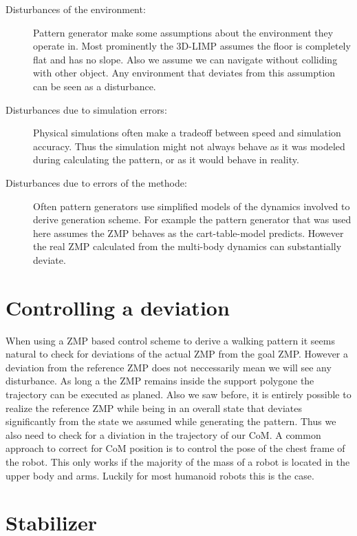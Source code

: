 \documentclass[english,ngerman]{KITreprt}
\begin{document}
\begin{description}
\item[Disturbances of the environment:]
Pattern generator make some assumptions about the environment they
operate in. Most prominently the 3D-LIMP assumes the floor is completely
flat and has no slope. Also we assume we can navigate without colliding
with other object. Any environment that deviates from this assumption
can be seen as a disturbance.
\item[Disturbances due to simulation errors:]
Physical simulations often make a tradeoff between speed and simulation
accuracy. Thus the simulation might not always behave as it was modeled
during calculating the pattern, or as it would behave in reality.
\item[Disturbances due to errors of the methode:]
Often pattern generators use simplified models of the dynamics involved
to derive generation scheme. For example the pattern generator that was
used here assumes the ZMP behaves as the cart-table-model predicts.
However the real ZMP calculated from the multi-body dynamics can
substantially deviate.
\end{description}

\section{Controlling a deviation}\label{controlling-a-deviation}

When using a ZMP based control scheme to derive a walking pattern it
seems natural to check for deviations of the actual ZMP from the goal
ZMP. However a deviation from the reference ZMP does not neccessarily
mean we will see any disturbance. As long a the ZMP remains inside the
support polygone the trajectory can be executed as planed. Also we saw
before, it is entirely possible to realize the reference ZMP while being
in an overall state that deviates significantly from the state we
assumed while generating the pattern. Thus we also need to check for a
diviation in the trajectory of our CoM. A common approach to correct for
CoM position is to control the pose of the chest frame of the robot.
This only works if the majority of the mass of a robot is located in the
upper body and arms. Luckily for most humanoid robots this is the case.

\section{Stabilizer}\label{section:stabilizer}
\end{document}
